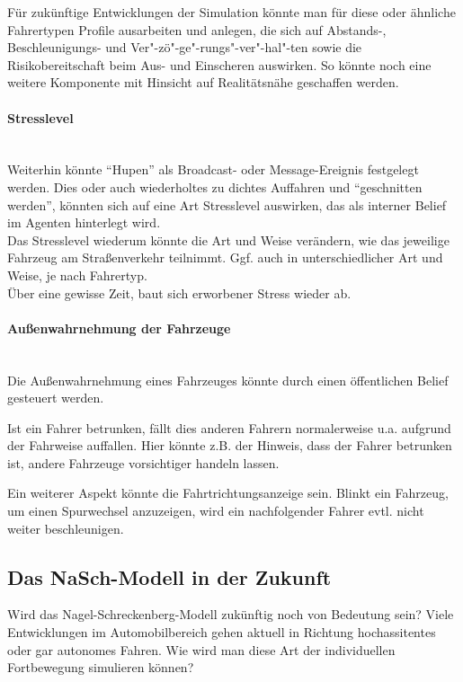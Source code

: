 Für zukünftige Entwicklungen der Simulation könnte man für diese oder ähnliche Fahrertypen Profile ausarbeiten und anlegen, die sich auf Abstands-, Beschleunigungs- und Ver"-zö"-ge"-rungs"-ver"-hal"-ten sowie die Risikobereitschaft beim Aus- und Einscheren auswirken.
So könnte noch eine weitere Komponente mit Hinsicht auf Realitätsnähe geschaffen werden. 

\paragraph*{Stresslevel}
\hfill \\
Weiterhin könnte \enquote{Hupen} als Broadcast- oder Message-Ereignis festgelegt werden.
Dies oder auch wiederholtes zu dichtes Auffahren und \enquote{geschnitten werden}, könnten sich auf eine Art Stresslevel auswirken, das als interner Belief im Agenten hinterlegt wird.
\\
Das Stresslevel wiederum könnte die Art und Weise verändern, wie das jeweilige Fahrzeug am Straßenverkehr teilnimmt. 
Ggf. auch in unterschiedlicher Art und Weise, je nach Fahrertyp.
\\
Über eine gewisse Zeit, baut sich erworbener Stress wieder ab.

\paragraph*{Außenwahrnehmung der Fahrzeuge}
\hfill \\
Die Außenwahrnehmung eines Fahrzeuges könnte durch einen öffentlichen Belief gesteuert werden. 

Ist ein Fahrer betrunken, fällt dies anderen Fahrern normalerweise u.a. aufgrund der Fahrweise auffallen.
Hier könnte z.B. der Hinweis, dass der Fahrer betrunken ist, andere Fahrzeuge vorsichtiger handeln lassen.

Ein weiterer Aspekt könnte die Fahrtrichtungsanzeige sein.
Blinkt ein Fahrzeug, um einen Spurwechsel anzuzeigen, wird ein nachfolgender Fahrer evtl. nicht weiter beschleunigen. 





\subsection{Das NaSch-Modell in der Zukunft}
Wird das Nagel-Schreckenberg-Modell zukünftig noch von Bedeutung sein? 
Viele Entwicklungen im Automobilbereich gehen aktuell in Richtung hochassitentes oder gar autonomes Fahren.
Wie wird man diese Art der individuellen Fortbewegung simulieren können?

